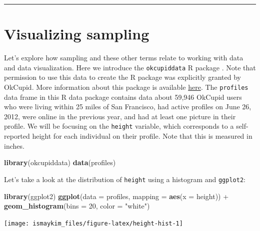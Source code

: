 \documentclass[]{tufte-book}
\newenvironment{Shaded}{\begin{snugshade}}{\end{snugshade}}
\newcommand{\KeywordTok}[1]{\textcolor[rgb]{0.13,0.29,0.53}{\textbf{{#1}}}}
\newcommand{\DataTypeTok}[1]{\textcolor[rgb]{0.13,0.29,0.53}{{#1}}}
\newcommand{\DecValTok}[1]{\textcolor[rgb]{0.00,0.00,0.81}{{#1}}}
\newcommand{\StringTok}[1]{\textcolor[rgb]{0.31,0.60,0.02}{{#1}}}
\newcommand{\NormalTok}[1]{{#1}}
\let\oldrule=\rule
\renewcommand{\rule}[1]{\oldrule{\linewidth}}
\theoremstyle{definition}
\theoremstyle{definition}
\theoremstyle{remark}
\begin{document}
\begin{center}\rule{0.5\linewidth}{\linethickness}\end{center}

\section{Visualizing sampling}\label{visualizing-sampling}

Let's explore how sampling and these other terms relate to working with
data and data visualization. Here we introduce the \texttt{okcupiddata}
R package \citep{R-okcupiddata}. Note that permission to use this data
to create the R package was explicitly granted by OkCupid. More
information about this package is available
\href{https://github.com/rudeboybert/okcupiddata}{here}. The
\texttt{profiles} data frame in this R data package contains data about
59,946 OkCupid users who were living within 25 miles of San Francisco,
had active profiles on June 26, 2012, were online in the previous year,
and had at least one picture in their profile. We will be focusing on
the \texttt{height} variable, which corresponds to a self-reported
height for each individual on their profile. Note that this is measured
in inches.

\begin{Shaded}
\begin{Highlighting}[]
\KeywordTok{library}\NormalTok{(okcupiddata)}
\KeywordTok{data}\NormalTok{(profiles)}
\end{Highlighting}
\end{Shaded}

Let's take a look at the distribution of \texttt{height} using a
histogram and \texttt{ggplot2}:

\begin{Shaded}
\begin{Highlighting}[]
\KeywordTok{library}\NormalTok{(ggplot2)}
\KeywordTok{ggplot}\NormalTok{(}\DataTypeTok{data =} \NormalTok{profiles, }\DataTypeTok{mapping =} \KeywordTok{aes}\NormalTok{(}\DataTypeTok{x =} \NormalTok{height)) +}
\StringTok{  }\KeywordTok{geom_histogram}\NormalTok{(}\DataTypeTok{bins =} \DecValTok{20}\NormalTok{, }\DataTypeTok{color =} \StringTok{"white"}\NormalTok{)}
\end{Highlighting}
\end{Shaded}

\begin{center}\texttt{[image: ismaykim\_files/figure-latex/height-hist-1]} \end{center}
\end{document}
